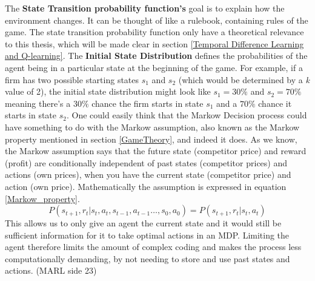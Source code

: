 \documentclass{article}
\begin{document}
\newline
The \textbf{State Transition probability function's} goal is to explain how the environment changes. It can be thought of like a rulebook, containing rules of the game. The state transition probability function only have a theoretical relevance to this thesis, which will be made clear in section \ref{Temporal Difference Learning and Q-learning}. 
\newline
The \textbf{Initial State Distribution} defines the probabilities of the agent being in a particular state at the beginning of the game. For example, if a firm has two possible starting states $s_1$ and $s_2$ (which would be determined by a \textit{k} value of 2), the initial state distribution might look like $s_1=30\%$ and $s_2 = 70\%$ meaning there's a $30\%$ chance the firm starts in state $s_1$ and a $70\%$ chance it starts in state $s_2$.
\newline 
\newline 
One could easily think that the Markow Decision process could have something to do with the Markow assumption, also known as the Markow property mentioned in section \ref{GameTheory}, and indeed it does. 
As we know, the Markow assumption says that the future state (competitor price) and reward (profit) are conditionally independent of past states (competitor prices) and actions (own prices), when you have the current state (competitor price) and action (own price). Mathematically the assumption is expressed in equation \ref{Markow_property}.
\begin{equation}
\label{Markow_property}
P(s_{t+1}, r_t | s_t, a_t, s_{t-1},a_{t-1} \dots, s_0, a_0) = P(s_{t+1}, r_t | s_t, a_t)
\end{equation}
This allows us to only give an agent the current state and it would still be sufficient information for it to take optimal actions in an MDP. 
Limiting the agent therefore limits the amount of complex coding and makes the process less computationally demanding, by not needing to store and use past states and actions. (MARL side 23)
\end{document}
